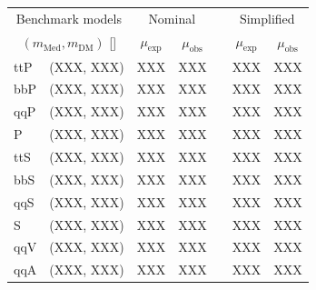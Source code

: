 \begin{table}[!t]
  \label{tab:dm_aggr_limits}
  \centering
  \begin{tabular}{ llccccc }
    \hline
    \multicolumn{2}{c}{Benchmark models}    & \multicolumn{2}{c}{Nominal}
                                            & 
                                            & \multicolumn{2}{c}{Simplified}             \\ [0.3ex]
    \cline{3-4}
    \cline{6-7}
   \multicolumn{2}{c}{$(m_{\text{Med}}, m_{\mathrm{DM}})$ [\GeVns{}]} 
                                            & $\mu_{\text{exp}}$
                                            & $\mu_{\text{obs}}$
                                            & 
                                            & $\mu_{\text{exp}}$
                                            & $\mu_{\text{obs}}$                         \\ [0.3ex]
    \hline
    \multirow{1}{*}{ttP} & (XXX, XXX)  & XXX & XXX &  & XXX & XXX \\
    \multirow{1}{*}{bbP} & (XXX, XXX)  & XXX & XXX &  & XXX & XXX \\
    \multirow{1}{*}{qqP} & (XXX, XXX)  & XXX & XXX &  & XXX & XXX \\
    \multirow{1}{*}{P}   & (XXX, XXX)  & XXX & XXX &  & XXX & XXX \\
    \multirow{1}{*}{ttS} & (XXX, XXX)  & XXX & XXX &  & XXX & XXX \\
    \multirow{1}{*}{bbS} & (XXX, XXX)  & XXX & XXX &  & XXX & XXX \\
    \multirow{1}{*}{qqS} & (XXX, XXX)  & XXX & XXX &  & XXX & XXX \\
    \multirow{1}{*}{S}   & (XXX, XXX)  & XXX & XXX &  & XXX & XXX \\
    \multirow{1}{*}{qqV} & (XXX, XXX)  & XXX & XXX &  & XXX & XXX \\
    \multirow{1}{*}{qqA} & (XXX, XXX)  & XXX & XXX &  & XXX & XXX \\
    \hline
  \end{tabular}
\end{table}


